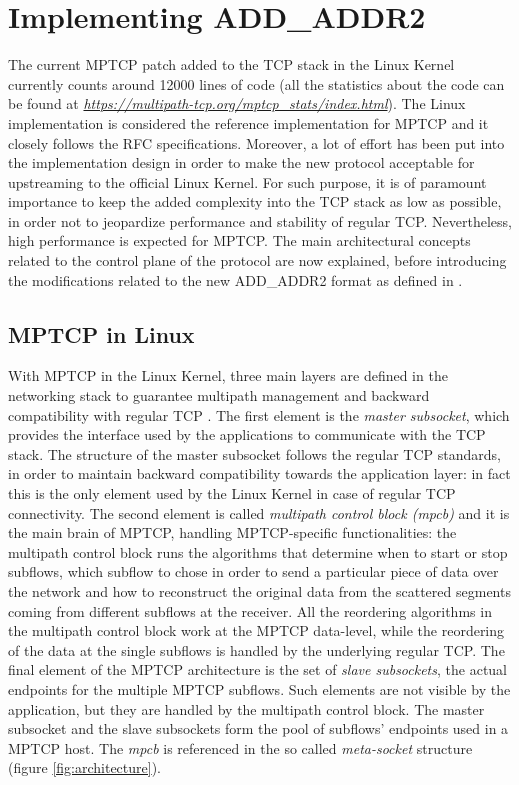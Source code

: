 \section{Implementing ADD\_ADDR2}
The current MPTCP patch added to the TCP stack in the Linux Kernel currently counts around 12000 lines of code (all the statistics about the code can be found at \href{https://multipath-tcp.org/mptcp\_stats/index.html}{\textit{https://multipath-tcp.org/mptcp\_stats/index.html}}). The Linux implementation is considered the reference implementation for MPTCP and it closely follows the RFC specifications. Moreover, a lot of effort has been put into the implementation design in order to make the new protocol acceptable for upstreaming to the official Linux Kernel. For such purpose, it is of paramount importance to keep the added complexity into the TCP stack as low as possible, in order not to jeopardize performance and stability of regular TCP. Nevertheless, high performance is expected for MPTCP. The main architectural concepts related to the control plane of the protocol are now explained, before introducing the modifications related to the new ADD\_ADDR2 format as defined in . 

\subsection{MPTCP in Linux}
With MPTCP in the Linux Kernel, three main layers are defined in the networking stack to guarantee multipath management and backward compatibility with regular TCP \cite{BPB11}. The first element is the \textit{master subsocket}, which provides the interface used by the applications to communicate with the TCP stack. The structure of the master subsocket follows the regular TCP standards, in order to maintain backward compatibility towards the application layer: in fact this is the only element used by the Linux Kernel in case of regular TCP connectivity. The second element is called \textit{multipath control block (mpcb)} and it is the main brain of MPTCP, handling MPTCP-specific functionalities: the multipath control block runs the algorithms that determine when to start or stop subflows, which subflow to chose in order to send a particular piece of data over the network and how to reconstruct the original data from the scattered segments coming from different subflows at the receiver. All the reordering algorithms in the multipath control block work at the MPTCP data-level, while the reordering of the data at the single subflows is handled by the underlying regular TCP. The final element of the MPTCP architecture is the set of \textit{slave subsockets}, the actual endpoints for the multiple MPTCP subflows. Such elements are not visible by the application, but they are handled by the multipath control block. The master subsocket and the slave subsockets form the pool of subflows' endpoints used in a MPTCP host. The \textit{mpcb} is referenced in the so called \textit{meta-socket} structure (figure \ref{fig:architecture}).

